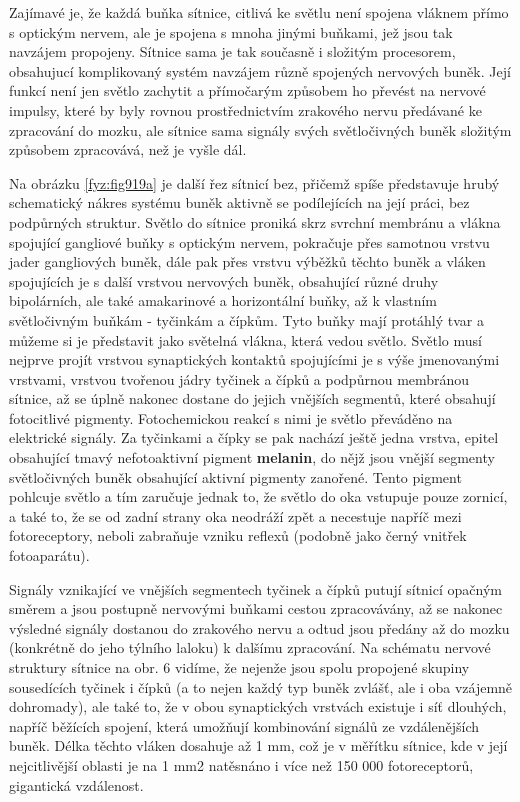     Zajímavé je, že každá buňka sítnice, citlivá ke světlu není spojena vláknem přímo s optickým
    nervem, ale je spojena s mnoha jinými buňkami, jež jsou tak navzájem propojeny. Sítnice sama je
    tak současně i složitým procesorem, obsahujucí komplikovaný systém navzájem různě spojených
    nervových buněk. Její funkcí není jen světlo zachytit a přímočarým způsobem ho převést na
    nervové impulsy, které by byly rovnou prostřednictvím zrakového nervu předávané ke zpracování do
    mozku, ale sítnice sama signály svých světločivných buněk složitým způsobem zpracovává, než je
    vyšle dál. 
    
    Na obrázku \ref{fyz:fig919a} je další řez sítnicí bez, přičemž spíše představuje hrubý
    schematický nákres systému buněk aktivně se podílejících na její práci, bez podpůrných struktur.
    Světlo do sítnice proniká skrz svrchní membránu a vlákna spojující gangliové buňky s optickým
    nervem, pokračuje přes samotnou vrstvu jader gangliových buněk, dále pak přes vrstvu výběžků
    těchto buněk a vláken spojujících je s další vrstvou nervových buněk, obsahující různé druhy
    bipolárních, ale také amakarinové a horizontální buňky, až k vlastním světločivným buňkám -
    tyčinkám a čípkům. Tyto buňky mají protáhlý tvar a můžeme si je představit jako světelná vlákna,
    která vedou světlo. Světlo musí nejprve projít vrstvou synaptických kontaktů spojujícími je s
    výše jmenovanými vrstvami, vrstvou tvořenou jádry tyčinek a čípků a podpůrnou membránou sítnice,
    až se úplně nakonec dostane do jejich vnějších segmentů, které obsahují fotocitlivé pigmenty.
    Fotochemickou reakcí s nimi je světlo převáděno na elektrické signály. Za tyčinkami a čípky se
    pak nachází ještě jedna vrstva, epitel obsahující tmavý nefotoaktivní pigment \textbf{melanin},
    do nějž jsou vnější segmenty světločivných buněk obsahující aktivní pigmenty zanořené. Tento
    pigment pohlcuje světlo a tím zaručuje jednak to, že světlo do oka vstupuje pouze zornicí, a
    také to, že se od zadní strany oka neodráží zpět a necestuje napříč mezi fotoreceptory, neboli
    zabraňuje vzniku reflexů (podobně jako černý vnitřek fotoaparátu).

    Signály vznikající ve vnějších segmentech tyčinek a čípků putují sítnicí opačným směrem a jsou
    postupně nervovými buňkami cestou zpracovávány, až se nakonec výsledné signály dostanou do
    zrakového nervu a odtud jsou předány až do mozku (konkrétně do jeho týlního laloku) k dalšímu
    zpracování. Na schématu nervové struktury sítnice na obr. 6 vidíme, že nejenže jsou spolu
    propojené skupiny sousedících tyčinek i čípků (a to nejen každý typ buněk zvlášť, ale i oba
    vzájemně dohromady), ale také to, že v obou synaptických vrstvách existuje i síť dlouhých,
    napříč běžících spojení, která umožňují kombinování signálů ze vzdálenějších buněk. Délka těchto
    vláken dosahuje až 1 mm, což je v měřítku sítnice, kde v její nejcitlivější oblasti je na 1 mm2
    natěsnáno i více než 150 000 fotoreceptorů, gigantická vzdálenost.

